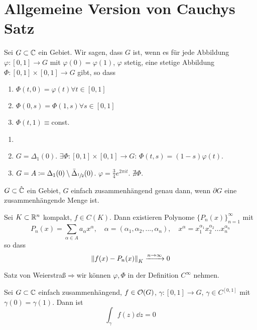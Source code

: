 \section{Allgemeine Version von Cauchys Satz}
\begin{definition}
	Sei $ G\subset\mathbb{C} $ ein Gebiet. Wir sagen, dass $ G $  ist, wenn es f\"ur jede Abbildung $ \varphi\colon[0,1]\rightarrow G $ mit $ \varphi(0)=\varphi(1) $, $ \varphi $ stetig, eine stetige Abbildung $ \Phi\colon[0,1]\times[0,1]\rightarrow G $ gibt, so dass
	\begin{enumerate}
		\item $ \Phi(t,0)=\varphi(t)\forall t\in[0,1] $
		\item $ \Phi(0,s)=\Phi(1,s)\forall s\in[0,1] $
		\item $ \Phi(t,1)\equiv $const.
	\end{enumerate}
\end{definition}
\begin{beispiel*}
	\begin{enumerate}
		\item[] 
		\item $ G=\Delta_1(0) $. $ \exists\Phi\colon[0,1]\times[0,1]\rightarrow G $: $ \Phi(t,s)=(1-s)\varphi(t) $.
		\item $ G=A\coloneqq \Delta_1(0)\setminus\bar{\Delta}_{\sfrac{1}{2}}(0) $. $ \varphi=\frac{3}{4}e^{2\pi it} $. $ \nexists\Phi $.
	\end{enumerate}
\end{beispiel*}
\begin{definition}
	$ G\subset\hat{\mathbb{C}} $ ein Gebiet, $ G $ einfach zusammenh\"angend genau dann, wenn $ \partial G $ eine zusammenh\"angende Menge ist.
\end{definition}
\begin{satz}[Weierstra\ss]
	Sei $ K\subset\mathbb{R}^n $ kompakt, $ f\in C(K) $. Dann existieren Polynome $ \lbrace P_n(x)\rbrace_{n=1}^\infty $ mit
	\[ P_n(x)=\sum_{\alpha\in A}^{} a_\alpha x^\alpha,\quad \alpha=(\alpha_1,\alpha_2,...,\alpha_n),\quad x^\alpha=x_1^{\alpha_1}x_2^{\alpha_2}...x_n^{\alpha_n}  \]
	so dass \[ \left\|f(x)-P_n(x)\right\|_K\xrightarrow{n\to\infty}0 \]
\end{satz}
\begin{bemerkung*}
	Satz von Weierstra\ss$ \Rightarrow $wir k\"onnen $ \varphi,\Phi $ in der Definition $ C^\infty $ nehmen.
\end{bemerkung*}
\begin{satz}
	Sei $ G\subset\mathbb{C} $ einfach zusammenh\"angend, $ f\in\mathcal O(G) $, $ \gamma\colon[0,1]\rightarrow G $, $ \gamma\in C^[0,1] $ mit $ \gamma(0)=\gamma(1) $. Dann ist
	\[ \int_{\gamma}^{} f(z)\dd z=0 \]
\end{satz}
